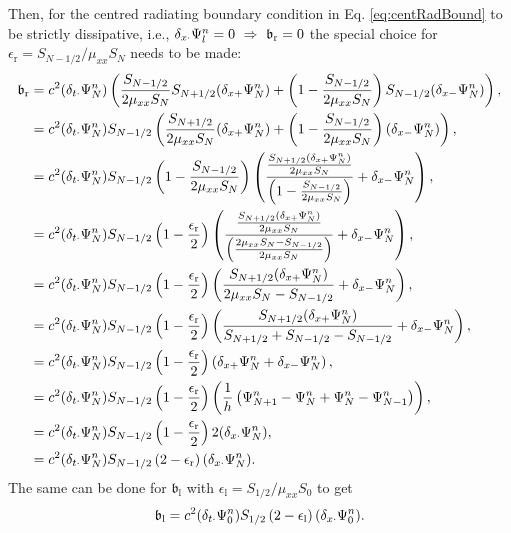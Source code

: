 Then, for the centred radiating boundary condition in Eq. \eqref{eq:centRadBound} to be strictly dissipative, i.e., $\dxd \Psiln = 0 \ \Rightarrow \ \b_\text{r} = 0$ the special choice for $\epsilon_\text{r} = S_{N-1/2} / \mu_{xx}S_N$ needs to be made:
\begin{equation}
    \begin{aligned}
        \mathfrak{b}_\text{r} &= c^2 (\delta_{t\cdot}\Psi_N^n)\left(\frac{S_{N-1/2}}{2\mu_{xx}S_N}S_{N+1/2}(\delta_{x+}\Psi_N^n)+\left(1-\frac{S_{N-1/2}}{2\mu_{xx}S_N}\right)S_{N-1/2}(\delta_{x-}\Psi_N^n)\right),\\
        &= c^2 (\delta_{t\cdot}\Psi_N^n)S_{N-1/2}\left(\frac{S_{N+1/2}}{2\mu_{xx}S_N}(\delta_{x+}\Psi_N^n)+\left(1-\frac{S_{N-1/2}}{2\mu_{xx}S_N}\right)(\delta_{x-}\Psi_N^n)\right),\\
        &=c^2 (\delta_{t\cdot}\Psi_N^n)S_{N-1/2}\left(1-\frac{S_{N-1/2}}{2\mu_{xx}S_N}\right)\left(\frac{\frac{S_{N+1/2}(\delta_{x+}\Psi_N^n)}{2\mu_{xx}S_N}}{\left(1-\frac{S_{N-1/2}}{2\mu_{xx}S_N}\right)}+\delta_{x-}\Psi_N^n\right),\\
        &=c^2 (\delta_{t\cdot}\Psi_N^n)S_{N-1/2}\left(1-\frac{\epsilon_\text{r}}{2}\right)\left(\frac{\frac{S_{N+1/2}(\delta_{x+}\Psi_N^n)}{2\mu_{xx}S_N}}{\left(\frac{2\mu_{xx}S_N - S_{N-1/2}}{2\mu_{xx}S_N}\right)}+\delta_{x-}\Psi_N^n\right),\\
        &=c^2 (\delta_{t\cdot}\Psi_N^n)S_{N-1/2}\left(1-\frac{\epsilon_\text{r}}{2}\right)\left(\frac{S_{N+1/2}(\delta_{x+}\Psi_N^n)}{2\mu_{xx}S_N - S_{N-1/2}}+\delta_{x-}\Psi_N^n\right),\\
        &=c^2 (\delta_{t\cdot}\Psi_N^n)S_{N-1/2}\left(1-\frac{\epsilon_\text{r}}{2}\right)\left(\frac{S_{N+1/2}(\delta_{x+}\Psi_N^n)}{S_{N+1/2} + S_{N-1/2} - S_{N-1/2}}+\delta_{x-}\Psi_N^n\right),\\
        &=c^2 (\delta_{t\cdot}\Psi_N^n)S_{N-1/2}\left(1-\frac{\epsilon_\text{r}}{2}\right)\left(\delta_{x+}\Psi_N^n+\delta_{x-}\Psi_N^n\right),\\
        &=c^2 (\delta_{t\cdot}\Psi_N^n)S_{N-1/2}\left(1-\frac{\epsilon_\text{r}}{2}\right)\left(\frac{1}{h}\left(\Psi_{N+1}^n - \Psi_N^n + \Psi_N^n - \Psi_{N-1}^n\right)\right),\\
&= c^2 (\delta_{t\cdot}\Psi_N^n)S_{N-1/2}\left(1-\frac{\epsilon_\text{r}}{2}\right)2(\delta_{x\cdot}\Psi_N^n),\\
&= c^2 (\delta_{t\cdot}\Psi_N^n)S_{N-1/2}\left(2-\epsilon_\text{r}\right)(\delta_{x\cdot}\Psi_N^n).
    \end{aligned}
\end{equation}
The same can be done for $\mathfrak{b}_\text{l}$ with $\epsilon_\text{l} = S_{1/2}/\mu_{xx}S_0$ to get
\begin{equation}
    \mathfrak{b}_\text{l} = c^2(\delta_{t\cdot}\Psi_0^n)S_{1/2}\left(2-\epsilon_\text{l}\right)(\delta_{x\cdot}\Psi_0^n).
\end{equation}